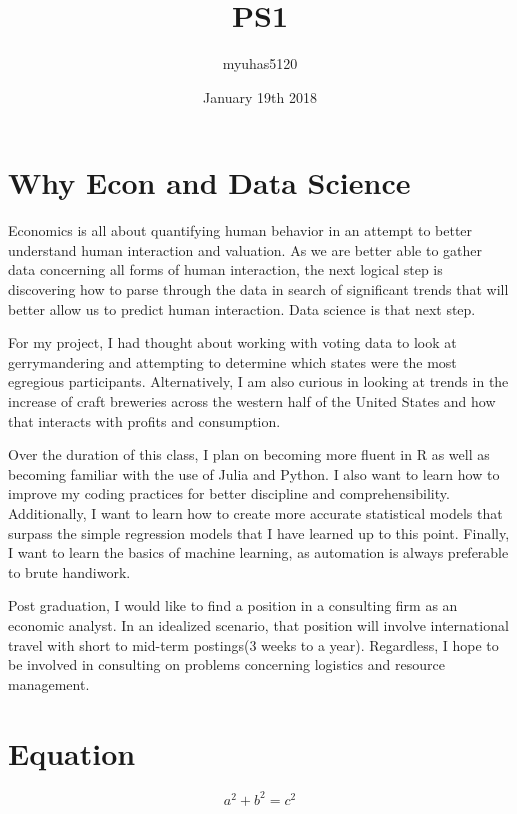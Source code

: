 \documentclass{article}
\title{PS1}
\author{myuhas5120 }
\date{January 19th 2018}
\begin{document}
\maketitle

\section{Why Econ and Data Science}
Economics is all about quantifying human behavior in an attempt to better understand human interaction and valuation. As we are better able to gather data concerning all forms of human interaction, the next logical step is discovering how to parse through the data in search of significant trends that will better allow us to predict human interaction.  Data science is that next step.

For my project, I had thought about working with voting data to look at gerrymandering and attempting to determine which states were the most egregious participants.  Alternatively, I am also curious in looking at trends in the increase of craft breweries across the western half of the United States and how that interacts with profits and consumption.

Over the duration of this class, I plan on becoming more fluent in R as well as becoming familiar with the use of Julia and Python.   I also want to learn how to improve my coding practices for better discipline and comprehensibility.  Additionally, I want to learn how to create more accurate statistical models that surpass the simple regression models that I have learned up to this point.  Finally,  I want to learn the basics of machine learning, as automation is always preferable to brute handiwork.

Post graduation, I would like to find a position in a consulting firm as an economic analyst.  In an idealized scenario, that position will involve international travel with short to mid-term postings(3 weeks to a year).  Regardless, I hope to be involved in consulting on problems concerning logistics and resource management. 

\section{Equation}
\[a^2 + b^2 = c^2 \]
\end{document}
